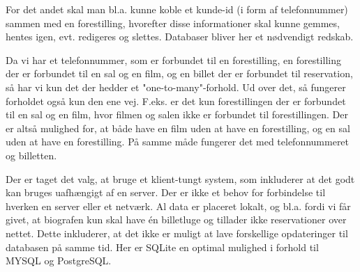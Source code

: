 For det andet skal man bl.a. kunne koble et kunde-id (i form af telefonnummer) sammen med en forestilling, hvorefter disse informationer skal kunne gemmes, hentes igen, evt. redigeres og slettes. Databaser bliver her et nødvendigt redskab.

Da vi har et telefonnummer, som er forbundet til en forestilling, en forestilling der er forbundet til en sal og en film, og en billet der er forbundet til reservation, så har vi kun det der hedder et "one-to-many"-forhold. Ud over det, så fungerer forholdet også kun den ene vej. F.eks. er det kun forestillingen der er forbundet til en sal og en film, hvor filmen og salen ikke er forbundet til forestillingen. Der er altså mulighed for, at både have en film uden at have en forestilling, og en sal uden at have en forestilling. På samme måde fungerer det med telefonnummeret og billetten.

Der er taget det valg, at bruge et klient-tungt system, som inkluderer at det godt kan bruges uafhængigt af en server. Der er ikke et behov for forbindelse til hverken en server eller et netværk. Al data er placeret lokalt, og bl.a. fordi vi får givet, at biografen kun skal have én billetluge og tillader ikke reservationer over nettet. Dette inkluderer, at det ikke er muligt at lave forskellige opdateringer til databasen på samme tid. Her er SQLite en optimal mulighed i forhold til MYSQL og PostgreSQL.
